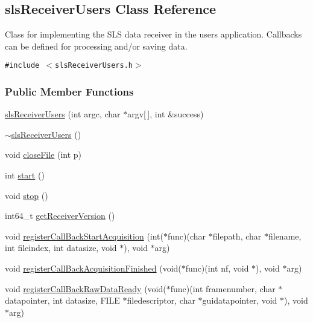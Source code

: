 \hypertarget{classslsReceiverUsers}{
\subsection{sls\-Receiver\-Users Class Reference}
\label{classslsReceiverUsers}
}
Class for implementing the SLS data receiver in the users application. Callbacks can be defined for processing and/or saving data.  


{\tt \#include $<$sls\-Receiver\-Users.h$>$}

\subsubsection*{Public Member Functions}
\begin{CompactItemize}
\item 
\hyperlink{classslsReceiverUsers_79a82ba94fbb19761c7701aa3901b8b1}{sls\-Receiver\-Users} (int argc, char $\ast$argv\mbox{[}$\,$\mbox{]}, int \&success)
\item 
\hyperlink{classslsReceiverUsers_9b45943d81ce7a09543aa446de857cb0}{$\sim$sls\-Receiver\-Users} ()
\item 
void \hyperlink{classslsReceiverUsers_bad0b3265826da2d9ebf48e59e9d5787}{close\-File} (int p)
\item 
int \hyperlink{classslsReceiverUsers_ef40b4987367b8a0116bcb66534dd7b7}{start} ()
\item 
void \hyperlink{classslsReceiverUsers_394001d873a4b7912865a971d4d25f87}{stop} ()
\item 
int64\_\-t \hyperlink{classslsReceiverUsers_f206092e2744e12ce6b717f4181d91a2}{get\-Receiver\-Version} ()
\item 
void \hyperlink{classslsReceiverUsers_5d4bb9244008d0bc570778230d30c5e3}{register\-Call\-Back\-Start\-Acquisition} (int($\ast$func)(char $\ast$filepath, char $\ast$filename, int fileindex, int datasize, void $\ast$), void $\ast$arg)
\item 
void \hyperlink{classslsReceiverUsers_7471d2945e8650eece86258e6ca56156}{register\-Call\-Back\-Acquisition\-Finished} (void($\ast$func)(int nf, void $\ast$), void $\ast$arg)
\item 
void \hyperlink{classslsReceiverUsers_343b9fac505e8c08a7fbf9efdd0f5762}{register\-Call\-Back\-Raw\-Data\-Ready} (void($\ast$func)(int framenumber, char $\ast$datapointer, int datasize, FILE $\ast$filedescriptor, char $\ast$guidatapointer, void $\ast$), void $\ast$arg)
\end{CompactItemize}
